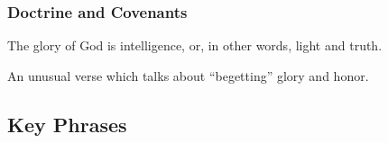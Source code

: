 	\subsubsection{Doctrine and Covenants} %
		\label{GLORY-DC}
	
		
		\begin{compactdesc}
			\item[{\hyperref[DC93-36]{DC 93:36}}] The glory of God is intelligence, or, in other words, light and truth.
			\item[{\hyperref[DC124-18]{DC 124:18}}]
				\begin{compactitem}
					\item An unusual verse which talks about ``begetting'' glory and honor.
				\end{compactitem}
		\end{compactdesc}
		
	
		
		
\subsection{Key Phrases} %
	\label{GLORY-PHRASES}

